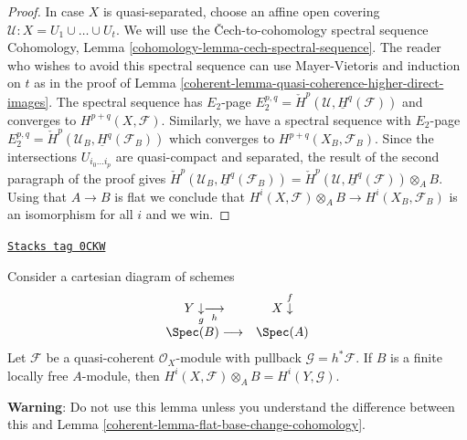 \begin{proof}
\medskip\noindent
In case $X$ is quasi-separated, choose an affine open covering
$\mathcal{U} : X = U_1 \cup \ldots \cup U_t$. We will use the
{\v C}ech-to-cohomology spectral sequence
Cohomology, Lemma \ref{cohomology-lemma-cech-spectral-sequence}.
The reader who wishes to avoid this spectral sequence
can use Mayer-Vietoris and induction on $t$ as in the proof of
Lemma \ref{coherent-lemma-quasi-coherence-higher-direct-images}.
The spectral sequence has $E_2$-page
$E_2^{p, q} = \check{H}^p(\mathcal{U}, \underline{H}^q(\mathcal{F}))$
and converges to $H^{p + q}(X, \mathcal{F})$.
Similarly, we have a spectral sequence with $E_2$-page
$E_2^{p, q} = \check{H}^p(\mathcal{U}_B, \underline{H}^q(\mathcal{F}_B))$
which converges to $H^{p + q}(X_B, \mathcal{F}_B)$.
Since the intersections $U_{i_0 \ldots i_p}$ are quasi-compact
and separated, the result of the second paragraph of the proof gives
$\check{H}^p(\mathcal{U}_B, \underline{H}^q(\mathcal{F}_B)) =
\check{H}^p(\mathcal{U}, \underline{H}^q(\mathcal{F})) \otimes_A B$.
Using that $A \to B$ is flat we conclude that
$H^i(X, \mathcal{F}) \otimes_A B \to H^i(X_B, \mathcal{F}_B)$
is an isomorphism for all $i$ and we win.
\end{proof}

\begin{lemma}

\label{coherent-lemma-finite-locally-free-base-change-cohomology}
\href{https://stacks.math.columbia.edu/tag/0CKW}{\texttt{Stacks tag 0CKW}}

Consider a cartesian diagram of schemes
$$
\begin{array}{cc}Y \underset{g}{\downarrow}\underset{h}{\longrightarrow} & X \overset{f}{\downarrow} \\ \Spec(B) \longrightarrow & \Spec(A)\end{array}
$$
Let $\mathcal{F}$ be a quasi-coherent $\mathcal{O}_X$-module
with pullback $\mathcal{G} = h^*\mathcal{F}$.
If $B$ is a finite locally free $A$-module, then
$H^i(X, \mathcal{F}) \otimes_A B = H^i(Y, \mathcal{G})$.
\end{lemma}

{\bf Warning}: Do not use this lemma unless you understand the difference
between this and Lemma \ref{coherent-lemma-flat-base-change-cohomology}.


